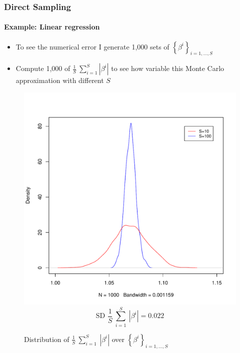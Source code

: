 \documentclass[
  shownotes,
  xcolor={svgnames},
  hyperref={colorlinks,citecolor=DarkBlue,linkcolor=DarkRed,urlcolor=DarkBlue}
  , aspectratio=169]{beamer}
\begin{document}
\begin{frame}[fragile]
\frametitle{Direct Sampling}
\framesubtitle{Example: Linear regression}

\begin{itemize}
\item To see the numerical error I generate 1,000 sets of $\left\{ \beta^{i} \right\}_{i = 1,\ldots,S}$

\item Compute 1,000 of $\frac{1}{S}\ \sum_{i = 1}^{S}\left| \beta^{i} \right|$ to see how variable this Monte Carlo approximation with different $S$

\end{itemize}




  \begin{figure}[H] \centering
  \centering
  \caption{Distribution of $\frac{1}{S}\ \sum_{i = 1}^{S}{\ \left| \beta^{i} \right|}$ over $\left\{ \beta^{i} \right\}_{i = 1,\ldots,S}$}
  \includegraphics[scale=0.2]{figures/n100}
  \\
  \tiny 
  $$\text{SD\ }\frac{1}{S}\ \sum_{i = 1}^{S}{\ \left| \beta^{i} \right|} = 0.022$$
\end{figure}  




\end{frame}
\end{document}
